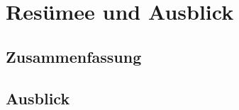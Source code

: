 \chapter{Resümee und Ausblick}

\section{Zusammenfassung}
\blindtext
\blindtext

\section{Ausblick}
\blindtext
\blindtext
